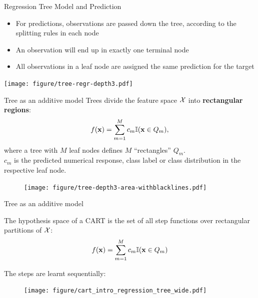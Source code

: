 \documentclass[11pt,compress,t,notes=noshow, xcolor=table]{beamer}
\begin{document}
\begin{vbframe}{Regression Tree Model and Prediction}
  \begin{itemize}
    \item For predictions, observations are passed down the tree, according to the splitting rules
      in each node
    \item An observation will end up in exactly one terminal node
    \item All observations in a leaf node are assigned the same prediction for the target
  \end{itemize}

\color{fgcolor}
{\centering \texttt{[image: figure/tree-regr-depth3.pdf]}

}

\end{vbframe}



\begin{vbframe}{Tree as an additive model}
Trees divide the feature space $\mathcal{X}$ into \textbf{rectangular regions}: 
  \begin{align*}
    f(\mathbf{x}) = \sum_{m=1}^M c_m \mathbb{I}(\mathbf{x} \in Q_m),
  \end{align*}
  where a tree with $M$ leaf nodes defines $M$ \enquote{rectangles} $Q_m$.\\
  $c_m$ is the predicted numerical response, class label or class
  distribution in the respective leaf node.
  \begin{figure}
\texttt{[image: figure/tree-depth3-area-withblacklines.pdf]}
\end{figure}

\end{vbframe}




\begin{vbframe}{Tree as an additive model}

The hypothesis space of a CART is the set of all step functions over rectangular partitions of $\mathcal{X}$:
\begin{align*}
    f(\mathbf{x}) = \sum_{m=1}^M c_m \mathbb{I}(\mathbf{x} \in Q_m)
\end{align*}

The steps are learnt sequentially:

\begin{figure} 
\texttt{[image: figure/cart\_intro\_regression\_tree\_wide.pdf]}
\end{figure}

\end{vbframe}
\end{document}
